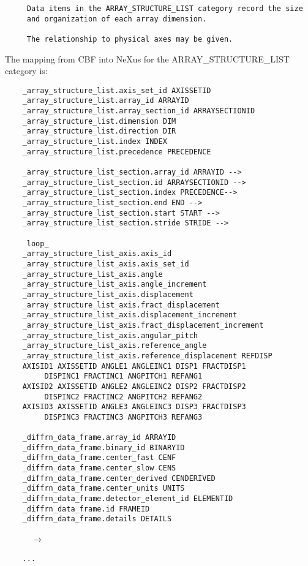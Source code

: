 \documentclass[11pt]{article}
\begin{document}
{\footnotesize\begin{verbatim}
     Data items in the ARRAY_STRUCTURE_LIST category record the size
     and organization of each array dimension.

     The relationship to physical axes may be given.
\end{verbatim}

The mapping from CBF into NeXus for the ARRAY\_STRUCTURE\_LIST category is:

\begin{verbatim}     
    _array_structure_list.axis_set_id AXISSETID
    _array_structure_list.array_id ARRAYID 
    _array_structure_list.array_section_id ARRAYSECTIONID
    _array_structure_list.dimension DIM
    _array_structure_list.direction DIR
    _array_structure_list.index INDEX
    _array_structure_list.precedence PRECEDENCE
    
    _array_structure_list_section.array_id ARRAYID -->
    _array_structure_list_section.id ARRAYSECTIONID --> 
    _array_structure_list_section.index PRECEDENCE-->
    _array_structure_list_section.end END -->
    _array_structure_list_section.start START -->
    _array_structure_list_section.stride STRIDE -->
     
     loop_                         
    _array_structure_list_axis.axis_id
    _array_structure_list_axis.axis_set_id 
    _array_structure_list_axis.angle 
    _array_structure_list_axis.angle_increment
    _array_structure_list_axis.displacement
    _array_structure_list_axis.fract_displacement
    _array_structure_list_axis.displacement_increment 
    _array_structure_list_axis.fract_displacement_increment
    _array_structure_list_axis.angular_pitch
    _array_structure_list_axis.reference_angle
    _array_structure_list_axis.reference_displacement REFDISP
    AXISID1 AXISSETID ANGLE1 ANGLEINC1 DISP1 FRACTDISP1
         DISPINC1 FRACTINC1 ANGPITCH1 REFANG1
    AXISID2 AXISSETID ANGLE2 ANGLEINC2 DISP2 FRACTDISP2
         DISPINC2 FRACTINC2 ANGPITCH2 REFANG2
    AXISID3 AXISSETID ANGLE3 ANGLEINC3 DISP3 FRACTDISP3
         DISPINC3 FRACTINC3 ANGPITCH3 REFANG3

    _diffrn_data_frame.array_id ARRAYID
    _diffrn_data_frame.binary_id BINARYID
    _diffrn_data_frame.center_fast CENF
    _diffrn_data_frame.center_slow CENS
    _diffrn_data_frame.center_derived CENDERIVED
    _diffrn_data_frame.center_units UNITS
    _diffrn_data_frame.detector_element_id ELEMENTID
    _diffrn_data_frame.id FRAMEID
    _diffrn_data_frame.details DETAILS
\end{verbatim}
~~~~~~{\bf{}$\rightarrow$}\\
\begin{verbatim}
    ...


\end{verbatim}}
\end{document}
